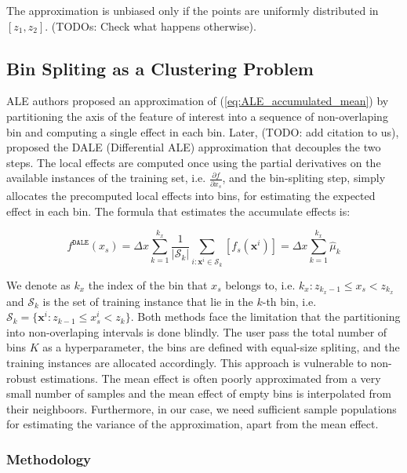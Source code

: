 \documentclass[twoside]{article}
\newcommand{\xb}{\mathbf{x}}
\begin{document}
The approximation is unbiased only if the points are uniformly
distributed in \([z_1, z_2]\). (TODOs: Check what happens
otherwise).

\subsection{Bin Spliting as a Clustering Problem}

ALE authors\citep{apley2020visualizing} proposed an approximation of
(\ref{eq:ALE_accumulated_mean}) by partitioning the axis of the
feature of interest into a sequence of non-overlaping bin and
computing a single effect in each bin. Later, (TODO: add citation to
us), proposed the DALE (Differential ALE) approximation that decouples
the two steps. The local effects are computed once using the partial
derivatives on the available instances of the training set,
i.e. \(\frac{\partial f}{\partial x_s}\), and the bin-spliting step,
simply allocates the precomputed local effects into bins, for
estimating the expected effect in each bin. The formula that estimates
the accumulate effects is:

\begin{equation}
  f^{\mathtt{DALE}}(x_s) = \Delta x \sum_{k=1}^{k_x}
  \frac{1}{|\mathcal{S}_k|} \sum_{i:\xb^i \in \mathcal{S}_k}
  [f_s(\xb^i)] = \Delta x \sum_{k=1}^{k_x} \hat{\mu}_k
 \label{eq:DALE}
\end{equation}

We denote as \(k_x\) the index of the bin that \(x_s\) belongs to,
i.e. \(k_x: z_{k_x-1} \leq x_s < z_{k_x} \) and \(\mathcal{S}_k\) is
the set of training instance that lie in the \(k\)-th bin, i.e.
\( \mathcal{S}_k = \{ \xb^i : z_{k-1} \leq x^i_s < z_{k} \} \). Both
methods face the limitation that the partitioning into non-overlaping
intervals is done blindly. The user pass the total number of bins
\(K\) as a hyperparameter, the bins are defined with equal-size
spliting, and the training instances are allocated accordingly. This
approach is vulnerable to non-robust estimations. The mean effect is
often poorly approximated from a very small number of samples and the
mean effect of empty bins is interpolated from their
neighboors. Furthermore, in our case, we need sufficient sample
populations for estimating the variance of the approximation, apart
from the mean effect.

\subsubsection{Methodology}
\end{document}
